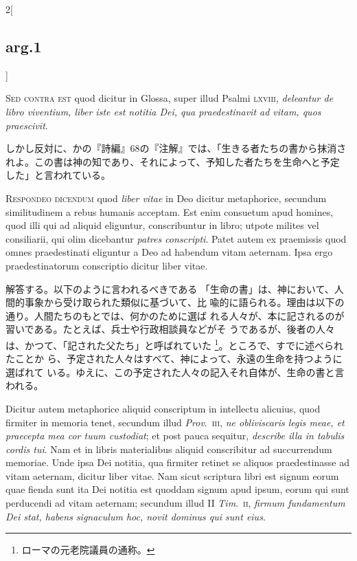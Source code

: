 \documentclass[paper=a4paper,fontsize=10pt,jafontsize=9pt,titlepage]{jlreq}
\begin{document}
\begin{paracol}{2}[\subsection{arg.1}]
\switchcolumn*[\subsection{s.c.}]

{\scshape Sed contra est} quod dicitur in Glossa, super
 illud Psalmi {\scshape lxviii}, {\itshape deleantur de libro viventium, liber iste est
 notitia Dei, qua praedestinavit ad vitam, quos praescivit}.

\switchcolumn

しかし反対に、かの『詩編』68の『注解』では、「生きる者たちの書から抹消さ
 れよ。この書は神の知であり、それによって、予知した者たちを生命へと予定
 した」と言われている。


{\scshape Respondeo dicendum} quod {\itshape liber vitae} in Deo
 dicitur metaphorice, secundum similitudinem a rebus humanis
 acceptam. Est enim consuetum apud homines, quod illi qui ad aliquid
 eliguntur, conscribuntur in libro; utpote milites vel consiliarii, qui
 olim dicebantur {\itshape patres conscripti}. Patet autem ex praemissis quod omnes
 praedestinati eliguntur a Deo ad habendum vitam aeternam. Ipsa ergo
 praedestinatorum conscriptio dicitur liber vitae.

\switchcolumn

解答する。以下のように言われるべきである
「生命の書」は、神において、人間的事象から受け取られた類似に基づいて、比
 喩的に語られる。理由は以下の通り。人間たちのもとでは、何かのために選ば
 れる人々が、本に記されるのが習いである。たとえば、兵士や行政相談員などがそ
 うであるが、後者の人々は、かつて、「記された父たち」と呼ばれていた
 \footnote{ローマの元老院議員の通称。}。ところで、すでに述べられたことか
 ら、予定された人々はすべて、神によって、永遠の生命を持つように選ばれて
 いる。ゆえに、この予定された人々の記入それ自体が、生命の書と言
 われる。

\switchcolumn*

Dicitur autem
 metaphorice aliquid conscriptum in intellectu alicuius, quod firmiter
 in memoria tenet, secundum illud {\itshape Prov}.~{\scshape iii}, {\itshape ne obliviscaris legis meae,
 et praecepta mea cor tuum custodiat}; et post pauca sequitur, {\itshape describe
 illa in tabulis cordis tui}. Nam et in libris materialibus aliquid
 conscribitur ad succurrendum memoriae. Unde ipsa Dei notitia, qua
 firmiter retinet se aliquos praedestinasse ad vitam aeternam, dicitur
 liber vitae. Nam sicut scriptura libri est signum eorum quae fienda
 sunt ita Dei notitia est quoddam signum apud ipsum, eorum qui sunt
 perducendi ad vitam aeternam; secundum illud II {\itshape Tim}.~{\scshape ii}, {\itshape firmum
 fundamentum Dei stat, habens signaculum hoc, novit dominus qui sunt
 eius}.


\end{paracol}
\end{document}

